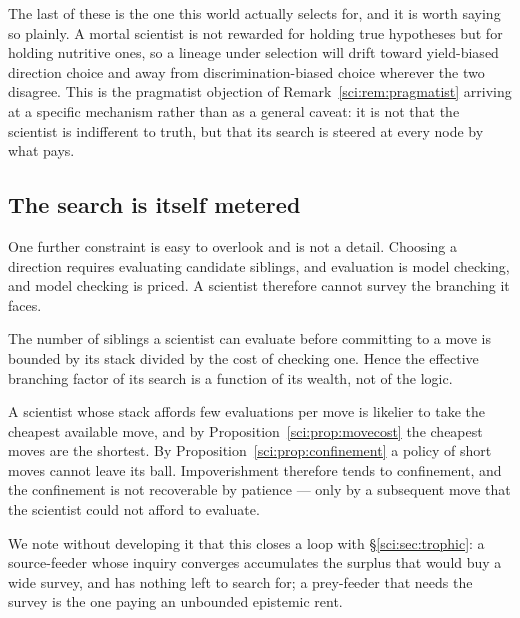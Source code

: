 \begin{remark}
\label{sci:rem:yieldbias}
The last of these is the one this world actually selects for, and it is worth saying so plainly. A
mortal scientist is not rewarded for holding true hypotheses but for holding nutritive ones, so a
lineage under selection will drift toward yield-biased direction choice and away from
discrimination-biased choice wherever the two disagree. This is the pragmatist objection of
Remark~\ref{sci:rem:pragmatist} arriving at a specific mechanism rather than as a general caveat: it is not
that the scientist is indifferent to truth, but that its search is steered at every node by what pays.
\end{remark}

\subsection{The search is itself metered}\label{sci:S6.4}

One further constraint is easy to overlook and is not a detail. Choosing a direction requires
evaluating candidate siblings, and evaluation is model checking, and model checking is priced. A
scientist therefore cannot survey the branching it faces.

\begin{proposition}
\label{sci:prop:branching}
The number of siblings a scientist can evaluate before committing to a move is bounded by its stack
divided by the cost of checking one. Hence the effective branching factor of its search is a function
of its wealth, not of the logic.
\end{proposition}

\begin{corollary}
\label{sci:cor:poverty}
A scientist whose stack affords few evaluations per move is likelier to take the cheapest available
move, and by Proposition~\ref{sci:prop:movecost} the cheapest moves are the shortest. By
Proposition~\ref{sci:prop:confinement} a policy of short moves cannot leave its ball. Impoverishment
therefore tends to confinement, and the confinement is not recoverable by patience --- only by a
subsequent move that the scientist could not afford to evaluate.
\end{corollary}

We note without developing it that this closes a loop with \S\ref{sci:sec:trophic}: a source-feeder whose
inquiry converges accumulates the surplus that would buy a wide survey, and has nothing left to search
for; a prey-feeder that needs the survey is the one paying an unbounded epistemic rent.

